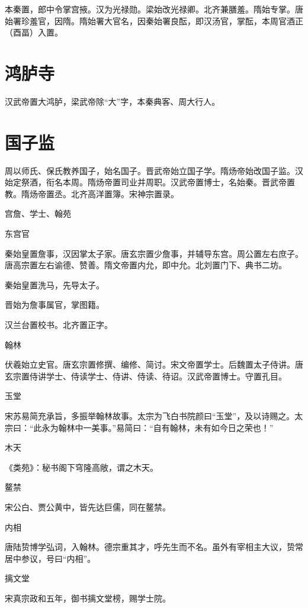 \documentclass[a4paper,12pt,UTF8,twoside]{ctexbook}
\begin{document}
    本秦置，郎中令掌宫掖。汉为光禄勋。梁始改光禄卿。北齐兼膳羞。隋始专掌。唐始署珍羞官，因隋。隋始署大官名，因秦始署良酝，即汉汤官，掌酝，本周官酒正（酉畐）入置。
    
    \section{鸿胪寺}
    
    汉武帝置大鸿胪，梁武帝除“大”字，本秦典客、周大行人。
    
    \section{国子监}
    
    周以师氏、保氏教养国子，始名国子。晋武帝始立国子学。隋炀帝始改国子监。汉始定祭酒，衔名本周。隋炀帝置司业并周职。汉武帝置博士，名始秦。晋武帝置教。隋炀帝置丞。北齐高洋置簿。宋神宗置录。
    
    宫詹、学士、翰苑
    
    东宫官
    
    秦始皇置詹事，汉因掌太子家。唐玄宗置少詹事，并辅导东宫。周公置左右庶子。唐高宗置左右谕德、赞善。隋文帝置内允，即中允。北刘置门下、典书二坊。
    
    秦始皇置洗马，先导太子。
    
    晋始为詹事属官，掌图籍。
    
    汉兰台置校书。北齐置正字。
    
    翰林
    
    伏羲始立史官。唐玄宗置修撰、编修、简讨。宋文帝置学士。后魏置太子侍讲。唐玄宗置侍讲学士、侍读学士、侍讲、侍读、待诏。汉武帝置博士。守置孔目。
    
    玉堂
    
    宋苏易简充承旨，多振举翰林故事。太宗为飞白书院颜曰“玉堂”，及以诗赐之。太宗曰：“此永为翰林中一美事。”易简曰：“自有翰林，未有如今日之荣也！”
    
    木天
    
    《类苑》：秘书阁下穹隆高敞，谓之木天。
    
    鳌禁
    
    宋公白、贾公黄中，皆先达巨儒，同在鳌禁。
    
    内相
    
    唐陆贽博学弘词，入翰林。德宗重其才，呼先生而不名。虽外有宰相主大议，贽常居中参议，号曰“内相”。
    
    摛文堂
    
    宋真宗政和五年，御书摛文堂榜，赐学士院。
    
\end{document}
